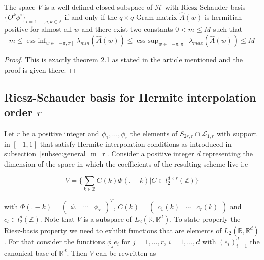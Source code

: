 \documentclass[a4paper, 11pt]{article}
\DeclareMathOperator*{\essinf}{ess\ inf}
\DeclareMathOperator*{\esssup}{ess\ sup}
\begin{document}
\begin{thm}{4}
  \label{thm:gram}
  The space $V$ is a well-defined closed subspace of $\mathcal{H}$ with Riesz-Schauder basis $\{O^k 
  \phi^i\}_{i=1,\dots,q, k \in \mathbb{Z}}$ if and only if the $q\times q$ Gram matrix $\hat{A}(w)$ is hermitian 
  positive for almost all $w$ and there exist two constants $0 < m \leq M$ such that
  \begin{equation}
    \label{eq:ess}
    m \leq \essinf_{w \in [-\pi, \pi]} \lambda_{min}(\hat{A}(w)) \leq \esssup_{w \in [-\pi, \pi]} 
  \lambda_{max}(\hat{A}(w)) \leq M \end{equation}
\end{thm}

\begin{proof} This is exactly theorem 2.1 as stated in the article mentioned and the proof is given there.
\end{proof}

\subsection{Riesz-Schauder basis for Hermite interpolation order $r$}

Let $r$ be a positive integer and $\phi_1, \ldots, \phi_r$ the elements of $S_{2r, r} \cap \mathcal{L}_{1,r}$ with 
support in $[-1,1]$ that satisfy Hermite interpolation conditions as introduced in subsection~\ref{subsec:general_m_r}.  
Consider a positive integer $d$ representing the dimension of the space in which the coefficients of the resulting 
scheme live i.e 

\begin{equation}
  \label{eq:Phi}
  V = \{ \sum_{k \in \mathbb{Z}} C(k) \Phi(.-k) | C \in l_2^{d\times r}(\mathbb{Z}) \}
\end{equation}

with $\Phi(.-k) = \begin{pmatrix} \phi_1 & \cdots & \phi_r \end{pmatrix}^T$, $C(k) =  \begin{pmatrix} c_1(k) & \cdots & 
c_r(k) \end{pmatrix}$ and $c_l \in l_2^d(\mathbb{Z})$. Note that $V$ is a subspace of $L_2(\mathbb{R}, \mathbb{R}^d)$.  
To state properly the Riesz-basis property we need to exhibit functions that are elements of $L_2(\mathbb{R}, 
\mathbb{R}^d)$. For that consider the functions $\phi_j e_i$ for $j=1, \ldots, r$, $i=1, \ldots, d$ with $(e_i)_{i=1}^d$ 
the canonical base of $\mathbb{R}^d$.  Then $V$ can be rewritten as
\end{document}
